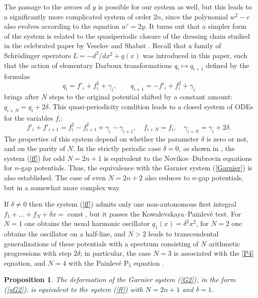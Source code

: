 \documentclass[11pt]{article}
\theoremstyle{plain}
\newtheorem{proposition}{Proposition}
\theoremstyle{definition}
\begin{document}
The passage to the zeroes of $y$ is possible for our system as well, but this leads to a significantly more complicated system of order $2n$, since the polynomial $w^2-c$ also evolves according to the equation $w'=2y$. It turns out that a simpler form of the system is related to the quasiperiodic closure of the dressing chain studied in the celebrated paper by Veselov and Shabat \cite{Veselov_Shabat_1993}. Recall that a family of Schr\"odinger operators $L=-d^2/dx^2+q(x)$ was introduced in this paper, such that the action of elementary Darboux transformations $q_i\mapsto q_{i+1}$ defined by the formulas
\begin{equation}\label{fq}
 q_i=f'_i+f^2_i+\gamma_i,\qquad q_{i+1}=-f'_i+f^2_i+\gamma_i
\end{equation}
brings after $N$ steps to the original potential shifted by a constant amount: $q_{i+N}=q_i+2\delta$. This quasi-periodicity condition leads to a closed system of ODEs for the variables $f_i$:
\begin{equation}\label{ff}
 f'_i+f'_{i+1}=f^2_i-f^2_{i+1}+\gamma_i-\gamma_{i+1},\quad 
 f_{i+N}=f_i,\quad \gamma_{i+N}=\gamma_i+2\delta.
\end{equation}
The properties of this system depend on whether the parameter $\delta$ is zero or not, and on the parity of $N$. In the strictly periodic case $\delta=0$, as shown in \cite{Veselov_Shabat_1993}, the system (\ref{ff}) for odd $N=2n+1$ is equivalent to the Novikov--Dubrovin equations for $n$-gap potentials. Thus, the equivalence with the Garnier system (\ref{Garnier}) is also established. The case of even $N=2n+2$ also reduces to $n$-gap potentials, but in a somewhat more complex way.

If $\delta\ne0$ then the system (\ref{ff}) admits only one non-autonomous first integral $f_1+\dots+f_N+\delta x=\operatorname{const}$, but it passes the Kowalevskaya--Painlev\'e test. For $N=1$ one obtains the usual harmonic oscillator $q_1(x)=\delta^2x^2$, for $N=2$ one obtains the oscillator on a half-line, and $N>2$ leads to transcendental generalizations of these potentials with a spectrum consisting of $N$ arithmetic progressions with step $2\delta$; in particular, the case $N=3$ is associated with the \ref{P4} equation, and $N=4$ with the Painlev\'e P$_5$ equation \cite{Veselov_Shabat_1993, Adler_1993}. 

\begin{proposition}\label{pr:G2ff}
The deformation of the Garnier system (\ref{G2}), in the form (\ref{yG2}), is equivalent to the system (\ref{ff}) with $N=2n+1$ and $\delta=1$.
\end{proposition}
\end{document}
